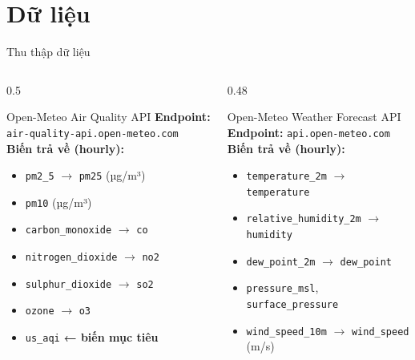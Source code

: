 \documentclass[aspectratio=169]{beamer}
\begin{document}
\section{Dữ liệu}

\begin{frame}{Thu thập dữ liệu}
  \begin{columns}[T]
    \begin{column}{0.5\textwidth}
      \begin{block}{Open-Meteo Air Quality API}
        \small
        \textbf{Endpoint:} \texttt{air-quality-api.open-meteo.com}\\[0.3em]
        \textbf{Biến trả về (hourly):}
        \begin{itemize}\small
          \item \texttt{pm2\_5} $\to$ \texttt{pm25} \quad (µg/m³)
          \item \texttt{pm10} \quad (µg/m³)
          \item \texttt{carbon\_monoxide} $\to$ \texttt{co}
          \item \texttt{nitrogen\_dioxide} $\to$ \texttt{no2}
          \item \texttt{sulphur\_dioxide} $\to$ \texttt{so2}
          \item \texttt{ozone} $\to$ \texttt{o3}
          \item \texttt{us\_aqi} \quad \textbf{← biến mục tiêu}
        \end{itemize}
      \end{block}
    \end{column}
    \begin{column}{0.48\textwidth}
      \begin{block}{Open-Meteo Weather Forecast API}
        \small
        \textbf{Endpoint:} \texttt{api.open-meteo.com}\\[0.3em]
        \textbf{Biến trả về (hourly):}
        \begin{itemize}\small
          \item \texttt{temperature\_2m} $\to$ \texttt{temperature}
          \item \texttt{relative\_humidity\_2m} $\to$ \texttt{humidity}
          \item \texttt{dew\_point\_2m} $\to$ \texttt{dew\_point}
          \item \texttt{pressure\_msl}, \texttt{surface\_pressure}
          \item \texttt{wind\_speed\_10m} $\to$ \texttt{wind\_speed} (m/s)

\end{itemize}
\end{block}
\end{column}
\end{columns}
\end{frame}
\end{document}
